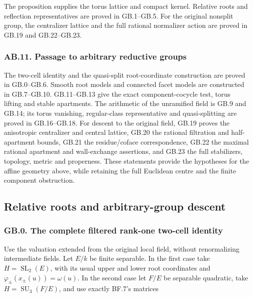 \documentclass[
  11pt,
]{article}
\begin{document}
The proposition supplies the torus lattice and compact kernel. Relative
roots and reflection representatives are proved in GB.1--GB.5. For the
original nonsplit group, the centralizer lattice and the full rational
normalizer action are proved in GB.19 and GB.22--GB.23.

\subsubsection{AB.11. Passage to arbitrary reductive
groups}\label{ab.11.-passage-to-arbitrary-reductive-groups}

The two-cell identity and the quasi-split root-coordinate construction
are proved in GB.0--GB.6. Smooth root models and connected facet models
are constructed in GB.7--GB.10. GB.11--GB.13 give the exact
component-cocycle test, torus lifting and stable apartments. The
arithmetic of the unramified field is GB.9 and GB.14; its torus
vanishing, regular-class representative and quasi-splitting are proved
in GB.16--GB.18. For descent to the original field, GB.19 proves the
anisotropic centralizer and central lattice, GB.20 the rational
filtration and half-apartment bounds, GB.21 the residue/coface
correspondence, GB.22 the maximal rational apartment and wall-exchange
assertions, and GB.23 the full stabilizers, topology, metric and
properness. These statements provide the hypotheses for the affine
geometry above, while retaining the full Euclidean centre and the finite
component obstruction.

\subsection{Relative roots and arbitrary-group
descent}\label{relative-roots-and-arbitrary-group-descent}

\subsubsection{GB.0. The complete filtered rank-one two-cell
identity}\label{gb.0.-the-complete-filtered-rank-one-two-cell-identity}

Use the valuation extended from the original local field, without
renormalizing intermediate fields. Let \(E/k\) be finite separable. In
the first case take \(H=\operatorname{SL}_2(E)\), with its usual upper
and lower root coordinates and \(\varphi_\pm(x_\pm(u))=\omega(u)\). In
the second case let \(F/E\) be separable quadratic, take
\(H=\operatorname{SU}_3(F/E)\), and use exactly BF.7's matrices
\end{document}
